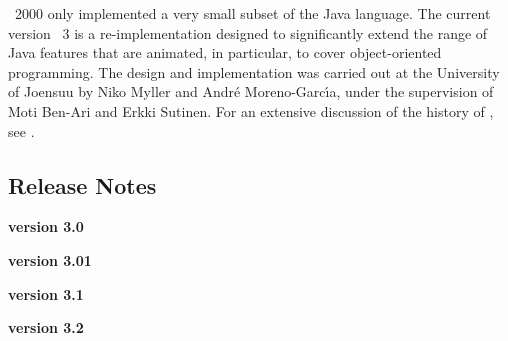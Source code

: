 \jel{}~2000 only implemented a very small subset of the Java language.
The current version \jel{}~3 is a re-implementation designed to
significantly extend the range of Java features that are animated,
in particular, to cover object-oriented programming. The design and
implementation was carried out at the University of Joensuu by
Niko Myller and Andr{\'{e}} Moreno-Garc{\'{\i}}a, under the supervision
of Moti Ben-Ari and Erkki Sutinen. For an extensive discussion of the
history of \jel{}, see \citep{Benari2002a}.

\subsection{Release Notes}
\label{sec:Release_Notes}

{\bf version 3.0}

{\bf version 3.01}

{\bf version 3.1}

{\bf version 3.2}
